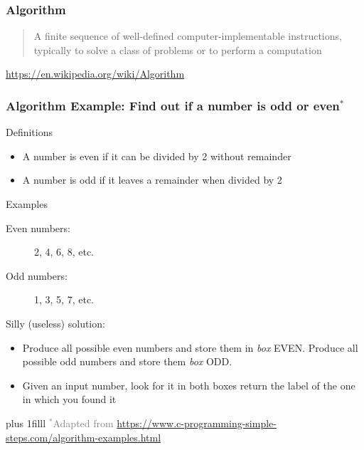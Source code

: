 \documentclass[xcolor=x11names]{beamer}
\newcommand{\light}[1]{\textcolor{gray}{#1}}
\newcommand{\btVFill}{\vskip0pt plus 1filll}
\begin{document}
\begin{frame}
\frametitle{Algorithm}

\begin{quote}
A finite sequence of \alert{well-defined computer-implementable} instructions, 
typically to solve a class of problems or to perform a computation
\end{quote}
\begin{flushright}
\footnotesize
 \light{\url{https://en.wikipedia.org/wiki/Algorithm}}
\end{flushright}
\end{frame}

\begin{frame}
\frametitle{Algorithm Example: Find out if a number is odd or 
even$^*$}
\pause 

\alert{Definitions}

\begin{itemize}
 \item A number is \alert{even} if it can be divided by 2 without remainder
 \item A number is \alert{odd} if it leaves a remainder when divided by 2
\end{itemize}				\pause 

\alert{Examples}

\begin{description}
 \item[Even numbers:] 2, 4, 6, 8, etc. 
 \item[Odd numbers:] 1, 3, 5, 7, etc.
\end{description}			\pause 

\alert{Silly (useless) solution:}

\begin{itemize}
 \item Produce all possible even numbers and store them in \textit{box}  
EVEN\@. Produce all possible odd numbers and store them \textit{box} ODD\@. 
 \item Given an input number, look for it in both boxes return the label of 
the one in which you found it
\end{itemize}	

\btVFill
\onslide
\footnotesize
\light{$^*$Adapted from 
\url{https://www.c-programming-simple-steps.com/algorithm-examples.html}}
\end{frame}
\end{document}
